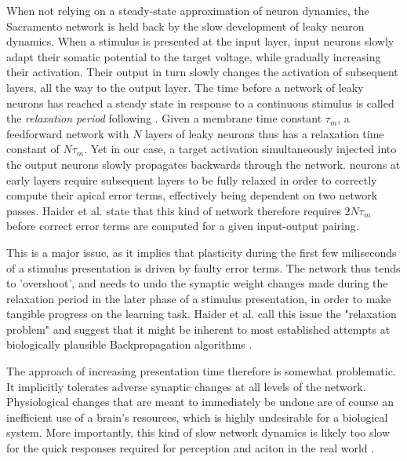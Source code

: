 When not relying on a steady-state approximation of neuron dynamics, the Sacramento network is held back by the slow
development of leaky neuron dynamics. When a stimulus is presented at the input layer, input neurons slowly adapt their
somatic potential to the target voltage, while gradually increasing their activation. Their output in turn slowly
changes the activation of subsequent layers, all the way to the output layer. The time before a network of leaky neurons
has reached a steady state in response to a continuous stimulus is called the \textit{relaxation period} following
\cite{Haider2021}. Given a membrane time constant $\tau_m$, a feedforward network with $N$ layers of leaky neurons thus
has a relaxation time constant of $N \tau_m$. Yet in our case, a target activation simultaneously injected into the
output neurons slowly propagates backwards through the network. neurons at early layers require subsequent layers to be
fully relaxed in order to correctly compute their apical error terms, effectively being dependent on two network passes.
Haider et al. state that this kind of network therefore requires $2N\tau_m$ before correct error terms are computed for
a given input-output pairing.

This is a major issue, as it implies that plasticity during the first few miliseconds of a stimulus presentation is
driven by faulty error terms. The network thus tends to 'overshoot', and needs to undo the synaptic weight changes made
during the relaxation period in the later phase of a stimulus presentation, in order to make tangible progress on the
learning task. Haider et al. call this issue the "relaxation problem" and suggest that it might be inherent to most
established attempts at biologically plausible Backpropagation algorithms
\citep{Whittington2017,guerguiev2017towards,sacramento2018dendritic,millidge2020activation}.


The approach of increasing presentation time therefore is somewhat problematic. It implicitly tolerates adverse synaptic
changes at all levels of the network. Physiological changes that are meant to immediately be undone  are of course an
inefficient use of a brain's resources, which is highly undesirable for a biological system. More importantly, this kind
of slow network dynamics is likely too slow for the quick responses required for perception and aciton in the real world
\citep{Bartunov2018}.\newline

